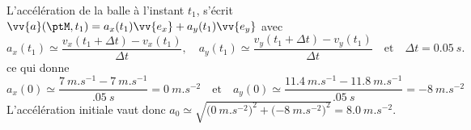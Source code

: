 \begin{corrige}
	L'accélération de la balle à l'instant $t_1$, s'écrit $\vv{a}(\ptM,t_1)=a_x(t_1) \vv{e_x} + a_y(t_1) \vv{e_y}$
	avec  
	\[
	a_x(t_1)\simeq\frac{v_x(t_1+\Delta t)-v_x(t_1)}{ \Delta t}, \quad a_y(t_1)\simeq\frac{v_y(t_1+\Delta t)-v_y(t_1)}{ \Delta t}
	\quad\text{et}\quad \Delta t=\SI{0,05}{s}.
	\]
	ce qui donne 
	\[
	a_x(0)\simeq
	\frac{\SI{7}{m.s^{-1}}-\SI{7}{m.s^{-1}}}{\SI{.05}{s}}=
	\SI{0}{m.s^{-2}}
	\quad\text{et}\quad
	a_y(0)\simeq
	\frac{\SI{11.4}{m.s^{-1}}-\SI{11.8}{m.s^{-1}}}{\SI{.05}{s}}=
	\SI{-8}{m.s^{-2}}
	\]
	L'accélération initiale vaut donc $a_0 \simeq \sqrt{\big(\SI{0}{m.s^{-2}}\big)^2+\big(\SI{-8}{m.s^{-2}}\big)^2}=\SI{8.0}{m.s^{-2}}$.
\end{corrige}


\finEntrainement




\newpage










\hauteurLargeurCadreReponse		{8mm}{5cm}
\typeEntrainement				{} %
\initialisationEntrainement


